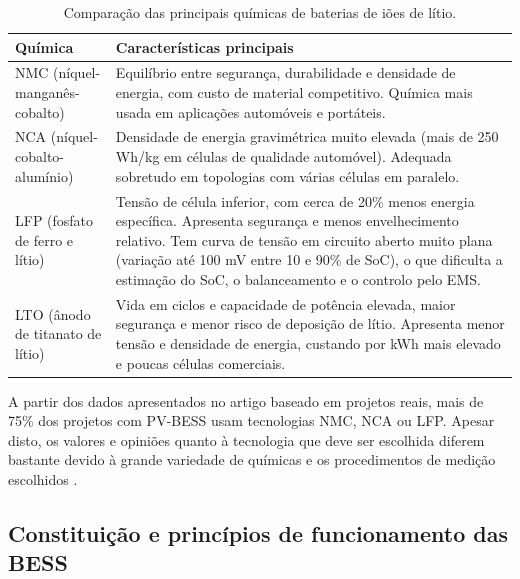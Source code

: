\begin{table}[H]
\centering
\renewcommand{\arraystretch}{1.5}
\begin{tabularx}{\textwidth}{
|>{\centering\arraybackslash}p{4cm}
|>{\centering\arraybackslash}X|}
\hline
\textbf{Química} & \textbf{Características principais} \\
\hline

NMC (níquel-manganês-cobalto) &
Equilíbrio entre segurança, durabilidade e densidade de energia, com custo de material competitivo. Química mais usada em aplicações automóveis e portáteis. \\
\hline

NCA (níquel-cobalto-alumínio) &
Densidade de energia gravimétrica muito elevada (mais de 250 Wh/kg em células de qualidade automóvel). Adequada sobretudo em topologias com várias células em paralelo. \\
\hline

LFP (fosfato de ferro e lítio) &
Tensão de célula inferior, com cerca de 20\% menos energia específica. Apresenta segurança e menos envelhecimento relativo. Tem curva de tensão em circuito aberto muito plana (variação até 100 mV entre 10 e 90\% de SoC), o que dificulta a estimação do SoC, o balanceamento e o controlo pelo EMS. \\
\hline

LTO (ânodo de titanato de lítio) &
Vida em ciclos e capacidade de potência elevada, maior segurança e menor risco de deposição de lítio. Apresenta menor tensão e densidade de energia, custando por kWh mais elevado e poucas células comerciais. \\
\hline

\end{tabularx}
\caption{Comparação das principais químicas de baterias de iões de lítio.}
\label{tab:quimicas_baterias}
\end{table}

A partir dos dados apresentados no artigo \cite{ Hesse2017} baseado em projetos reais, mais de 75\% dos projetos com PV-BESS usam tecnologias NMC, NCA ou LFP. Apesar disto, os valores e opiniões quanto à tecnologia que deve ser escolhida diferem bastante devido à grande variedade de químicas e os procedimentos de medição escolhidos \cite{ Hesse2017}.  


\subsection{Constituição e princípios de funcionamento das BESS}
\label{sec:Ch2.1.2}

